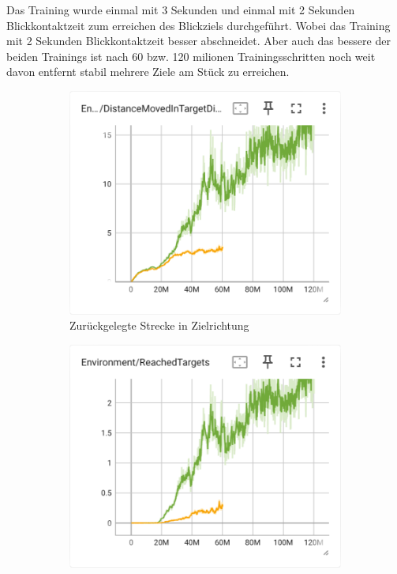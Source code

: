 Das Training wurde einmal mit 3 Sekunden und einmal mit 2 Sekunden Blickkontaktzeit zum erreichen des Blickziels durchgeführt. Wobei das Training mit 2 Sekunden Blickkontaktzeit besser abschneidet. Aber auch das bessere der beiden Trainings ist nach 60 bzw. 120 milionen Trainingsschritten noch weit davon entfernt stabil mehrere Ziele am Stück zu erreichen.

\begin{figure}[H]
  \centering  
    \begin{subfigure}{.49\textwidth}
      \centering  
      \includegraphics[width=\textwidth]{img/117_119_move_target_dir}
      \caption{Zurückgelegte Strecke in Zielrichtung}
      \label{fig:117_119_move_target_dir}
    \end{subfigure}
    \begin{subfigure}{.49\textwidth}
      \centering  
      \includegraphics[width=\textwidth]{img/117_119_reach_target}

\end{subfigure}
\end{figure}

